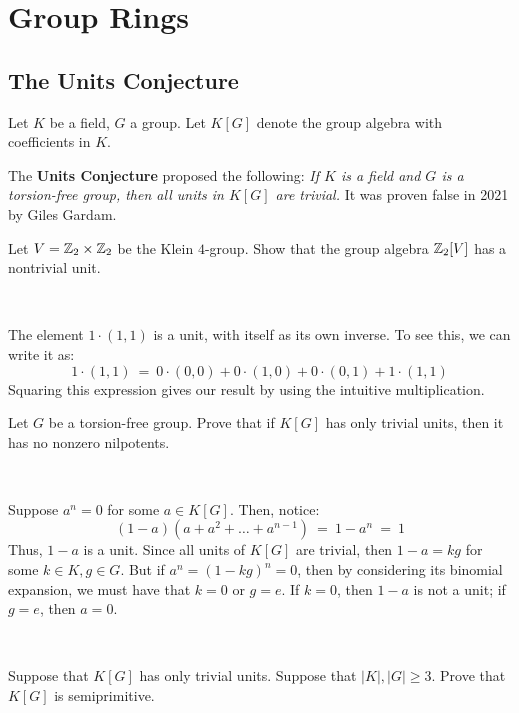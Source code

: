 \section{Group Rings}
\setcounter{subsection}{0}

\subsection{The Units Conjecture}
Let $K$ be a field, $G$ a group.
Let $K[G]$ denote the group algebra with coefficients in $K$.

The \textbf{Units Conjecture} proposed the following:
\textit{If $K$ is a field and $G$ is a torsion-free group,
then all units in $K[G]$ are trivial.}
It was proven false in 2021 by Giles Gardam.

\begin{exr}
	Let $V=\mathbb{Z}_2\times \mathbb{Z}_2$ be the Klein $4$-group.
	Show that the group algebra $\mathbb{Z}_2[V]$ has a nontrivial unit.
\end{exr} \

\begin{soln}
	The element $1\cdot(1,1)$ is a unit, with itself as its own inverse.
	To see this, we can write it as:
	\begin{equation*}
		1\cdot(1,1) \ = \ 0\cdot(0,0)+0\cdot(1,0)+0\cdot(0,1)+1\cdot(1,1)
	\end{equation*}
	Squaring this expression gives our result by using the intuitive
	multiplication.
\end{soln}

\newpage
\begin{exr}
	Let $G$ be a torsion-free group.
	Prove that if $K[G]$ has only trivial units,
	then it has no nonzero nilpotents.
\end{exr} \

\begin{pf}
	Suppose $a^{n}=0$ for some $a\in K[G]$.
	Then, notice:
	\begin{equation*}
		(1-a)(a+a^{2}+\dots +a^{n-1})
		\ = \ 1-a^{n} \ = \ 1
	\end{equation*}
	Thus, $1-a$ is a unit.
	Since all units of $K[G]$ are trivial, then $1-a=kg$ for some $k\in K,g\in G$.
	But if $a^{n}=(1-kg)^{n}=0$, then by considering its binomial expansion,
	we must have that $k=0$ or $g=e$.
	If $k=0$, then $1-a$ is not a unit; if $g=e$, then $a=0$.
\end{pf} \

\begin{exr}
	Suppose that $K[G]$ has only trivial units.
	Suppose that $|K|,|G|\geq 3$. Prove that $K[G]$ is semiprimitive.
\end{exr} \

